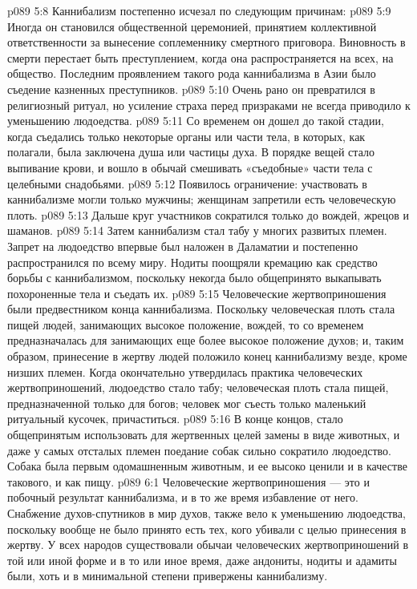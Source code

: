 \vs p089 5:8 \pc Каннибализм постепенно исчезал по следующим причинам:
\vs p089 5:9 \bibnobreakspace Иногда он становился общественной церемонией, принятием коллективной ответственности за вынесение соплеменнику смертного приговора. Виновность в смерти перестает быть преступлением, когда она распространяется на всех, на общество. Последним проявлением такого рода каннибализма в Азии было съедение казненных преступников.
\vs p089 5:10 \bibnobreakspace Очень рано он превратился в религиозный ритуал, но усиление страха перед призраками не всегда приводило к уменьшению людоедства.
\vs p089 5:11 \bibnobreakspace Со временем он дошел до такой стадии, когда съедались только некоторые органы или части тела, в которых, как полагали, была заключена душа или частицы духа. В порядке вещей стало выпивание крови, и вошло в обычай смешивать «съедобные» части тела с целебными снадобьями.
\vs p089 5:12 \bibnobreakspace Появилось ограничение: участвовать в каннибализме могли только мужчины; женщинам запретили есть человеческую плоть.
\vs p089 5:13 \bibnobreakspace Дальше круг участников сократился только до вождей, жрецов и шаманов.
\vs p089 5:14 \bibnobreakspace Затем каннибализм стал табу у многих развитых племен. Запрет на людоедство впервые был наложен в Даламатии и постепенно распространился по всему миру. Нодиты поощряли кремацию как средство борьбы с каннибализмом, поскольку некогда было общепринято выкапывать похороненные тела и съедать их.
\vs p089 5:15 \bibnobreakspace Человеческие жертвоприношения были предвестником конца каннибализма. Поскольку человеческая плоть стала пищей людей, занимающих высокое положение, вождей, то со временем предназначалась для занимающих еще более высокое положение духов; и, таким образом, принесение в жертву людей положило конец каннибализму везде, кроме низших племен. Когда окончательно утвердилась практика человеческих жертвоприношений, людоедство стало табу; человеческая плоть стала пищей, предназначенной только для богов; человек мог съесть только маленький ритуальный кусочек, причаститься.
\vs p089 5:16 \pc В конце концов, стало общепринятым использовать для жертвенных целей замены в виде животных, и даже у самых отсталых племен поедание собак сильно сократило людоедство. Собака была первым одомашненным животным, и ее высоко ценили и в качестве такового, и как пищу.
\vs p089 6:1 Человеческие жертвоприношения --- это и побочный результат каннибализма, и в то же время избавление от него. Снабжение духов\hyp{}спутников в мир духов, также вело к уменьшению людоедства, поскольку вообще не было принято есть тех, кого убивали с целью принесения в жертву. У всех народов существовали обычаи человеческих жертвоприношений в той или иной форме и в то или иное время, даже андониты, нодиты и адамиты были, хоть и в минимальной степени привержены каннибализму.
